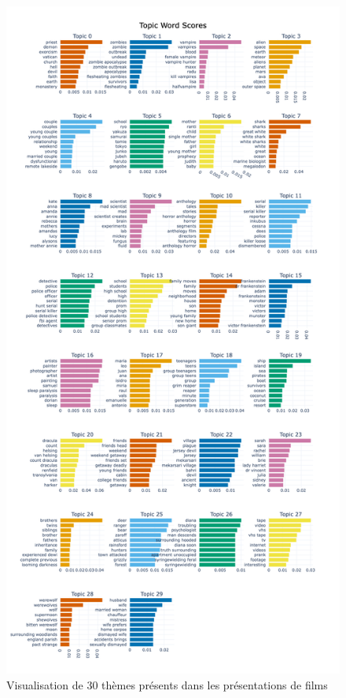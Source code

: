 \documentclass[a4paper,12pt,onecolumn,oneside]{article}
\begin{document}
\begin{figure}[htpb]
\centering
    \includegraphics[scale=0.2]{bertopic_film.png}
    \caption{Visualisation de 30 thèmes présents dans les présentations de films}
\end{figure}
\end{document}
